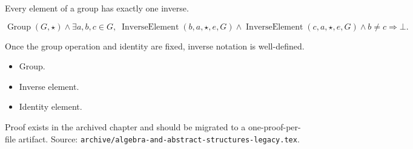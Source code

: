 \begin{remark*}
Every element of a group has exactly one inverse.
\end{remark*}

\begin{remark*}
\[
\operatorname{Group}(G,\star)
\land
\exists a,b,c\in G,\;
\operatorname{InverseElement}(b,a,\star,e,G)
\land
\operatorname{InverseElement}(c,a,\star,e,G)
\land b\neq c
\Longrightarrow \bot.
\]
\end{remark*}

\begin{remark*}[Interpretation]
Once the group operation and identity are fixed, inverse notation is
well-defined.
\end{remark*}

\begin{remark*}[Dependencies]
\begin{itemize}
  \item Group.
  \item Inverse element.
  \item Identity element.
\end{itemize}
\end{remark*}

\begin{remark*}
Proof exists in the archived chapter and should be migrated to a
one-proof-per-file artifact.
Source: \texttt{archive/algebra-and-abstract-structures-legacy.tex}.
\end{remark*}
